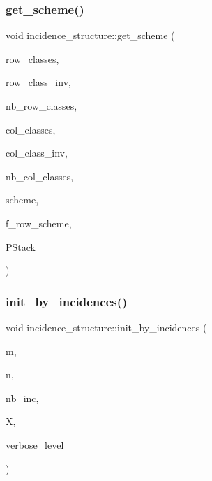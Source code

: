 \subsubsection{\texorpdfstring{get\+\_\+scheme()}{get\_scheme()}}
{\footnotesize\ttfamily void incidence\+\_\+structure\+::get\+\_\+scheme (\begin{DoxyParamCaption}\item[{\mbox{\hyperlink{galois_8h_a09fddde158a3a20bd2dcadb609de11dc}{I\+NT}} $\ast$\&}]{row\+\_\+classes,  }\item[{\mbox{\hyperlink{galois_8h_a09fddde158a3a20bd2dcadb609de11dc}{I\+NT}} $\ast$\&}]{row\+\_\+class\+\_\+inv,  }\item[{\mbox{\hyperlink{galois_8h_a09fddde158a3a20bd2dcadb609de11dc}{I\+NT}} \&}]{nb\+\_\+row\+\_\+classes,  }\item[{\mbox{\hyperlink{galois_8h_a09fddde158a3a20bd2dcadb609de11dc}{I\+NT}} $\ast$\&}]{col\+\_\+classes,  }\item[{\mbox{\hyperlink{galois_8h_a09fddde158a3a20bd2dcadb609de11dc}{I\+NT}} $\ast$\&}]{col\+\_\+class\+\_\+inv,  }\item[{\mbox{\hyperlink{galois_8h_a09fddde158a3a20bd2dcadb609de11dc}{I\+NT}} \&}]{nb\+\_\+col\+\_\+classes,  }\item[{\mbox{\hyperlink{galois_8h_a09fddde158a3a20bd2dcadb609de11dc}{I\+NT}} $\ast$\&}]{scheme,  }\item[{\mbox{\hyperlink{galois_8h_a09fddde158a3a20bd2dcadb609de11dc}{I\+NT}}}]{f\+\_\+row\+\_\+scheme,  }\item[{\mbox{\hyperlink{classpartitionstack}{partitionstack}} \&}]{P\+Stack }\end{DoxyParamCaption})}

\mbox{\label{classincidence__structure_aef38c0dfbf25d6a4a498a7e2c4414838}} 
\subsubsection{\texorpdfstring{init\+\_\+by\+\_\+incidences()}{init\_by\_incidences()}}
{\footnotesize\ttfamily void incidence\+\_\+structure\+::init\+\_\+by\+\_\+incidences (\begin{DoxyParamCaption}\item[{\mbox{\hyperlink{galois_8h_a09fddde158a3a20bd2dcadb609de11dc}{I\+NT}}}]{m,  }\item[{\mbox{\hyperlink{galois_8h_a09fddde158a3a20bd2dcadb609de11dc}{I\+NT}}}]{n,  }\item[{\mbox{\hyperlink{galois_8h_a09fddde158a3a20bd2dcadb609de11dc}{I\+NT}}}]{nb\+\_\+inc,  }\item[{\mbox{\hyperlink{galois_8h_a09fddde158a3a20bd2dcadb609de11dc}{I\+NT}} $\ast$}]{X,  }\item[{\mbox{\hyperlink{galois_8h_a09fddde158a3a20bd2dcadb609de11dc}{I\+NT}}}]{verbose\+\_\+level }\end{DoxyParamCaption})}

